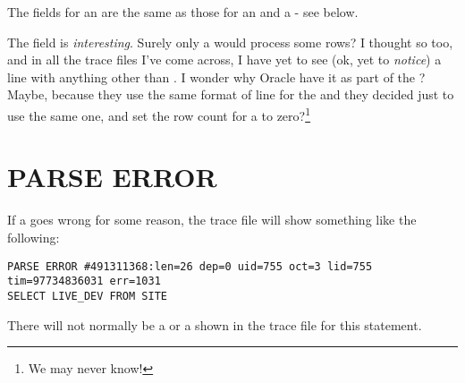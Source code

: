 The fields for an  are the same as those for an  and a  - see below.

The  field is \emph{interesting}. Surely only a  would process some rows? I thought so too, and in all the trace files I've come across, I have yet to see (ok, yet to \emph{notice}) a  line with anything other than . I wonder why Oracle have it as part of the ? Maybe, because they use the same format of line for the  and  they decided just to use the same one, and set the row count for a  to zero?\footnote{We may never know!}

\newpage\section{PARSE ERROR}\label{parse-error}

If a  goes wrong for some reason, the trace file will show something like the following:

\begin{lstlisting}[numbers=none,caption={Parse Error Line}]
PARSE ERROR #491311368:len=26 dep=0 uid=755 oct=3 lid=755 tim=97734836031 err=1031
SELECT LIVE_DEV FROM SITE
\end{lstlisting}

There will not normally be a  or a  shown in the trace file for this statement.

